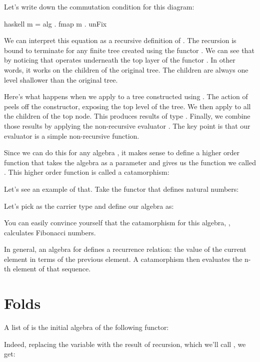 \noindent
Let's write down the commutation condition for this diagram:

\begin{snip}{haskell}
	m = alg . fmap m . unFix
\end{snip}
We can interpret this equation as a recursive definition of .
The recursion is bound to terminate for any finite tree created using
the functor . We can see that by noticing that
 operates underneath the top layer of the functor
. In other words, it works on the children of the original
tree. The children are always one level shallower than the original
tree.

Here's what happens when we apply  to a tree constructed using
. The action of  peels off the constructor,
exposing the top level of the tree. We then apply  to all the
children of the top node. This produces results of type .
Finally, we combine those results by applying the non-recursive
evaluator . The key point is that our evaluator 
is a simple non-recursive function.

Since we can do this for any algebra , it makes sense to
define a higher order function that takes the algebra as a parameter and
gives us the function we called . This higher order function
is called a catamorphism:

Let's see an example of that. Take the functor that defines natural
numbers:

Let's pick  as the carrier type and define our
algebra as:

You can easily convince yourself that the catamorphism for this algebra,
, calculates Fibonacci numbers.

In general, an algebra for  defines a recurrence relation:
the value of the current element in terms of the previous element. A
catamorphism then evaluates the n-th element of that sequence.

\section{Folds}

A list of  is the initial algebra of the following functor:

Indeed, replacing the variable  with the result of recursion,
which we'll call , we get:


